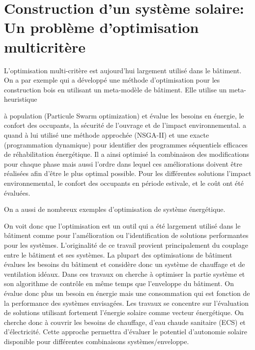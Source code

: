 
\section{Construction d’un système solaire: Un problème d’optimisation multicritère} %
\label{sec:construction_d_un_systeme_solaire_un_probleme_d_optimisation}


L’optimisation multi-critère est aujourd’hui largement utilisé dans le bâtiment.
On a par exemple \cite{Decker2015} qui a développé une méthode d’optimisation pour les
construction bois en utilisant un meta-modèle de bâtiment. Elle utilise un meta-heuristique

à population (Particule Swarm optimization) et évalue les besoins en énergie, le confort des
occupants, la sécurité de l’ouvrage et de l’impact environnemental. \cite{Rivallain2013}
a quand à lui utilisé une méthode approchée (NSGA-II) et une exacte (programmation dynamique)
pour identifier des programmes séquentiels efficaces de réhabilitation énergétique.
Il a ainsi optimisé la combinaison des modifications pour chaque phase mais aussi l’ordre
dans lequel ces améliorations doivent être réalisées afin d’être le plus optimal
possible.
Pour les différentes solutions l’impact environnemental, le confort des occupants en
période estivale, et le coût ont été évaluées.


On a aussi de nombreux exemples d’optimisation de système énergétique.

On voit donc que l’optimisation est un outil qui a été largement utilisé dans
le bâtiment comme pour l’amélioration ou l’identification de solutions performantes
pour les systèmes.
L’originalité de ce travail provient principalement du couplage entre le bâtiment
et ses systèmes. La plupart des optimisations de bâtiment évalues les besoins
du bâtiment et considère donc un système de chauffage et de ventilation idéaux.
Dans ces travaux on cherche à optimiser la partie système et son algorithme de
contrôle en même temps que l’enveloppe du bâtiment. On évalue donc plus un besoin
en énergie mais une consommation qui est fonction de la performance des systèmes
envisagées. Les travaux se concentre sur l’évaluation de solutions utilisant fortement
l’énergie solaire comme vecteur énergétique. On cherche donc à couvrir les besoins
de chauffage, d’eau chaude sanitaire (ECS) et d’électricité.
Cette approche permettra d’évaluer le potentiel d’autonomie solaire disponible
pour différentes combinaisons systèmes/enveloppe.

